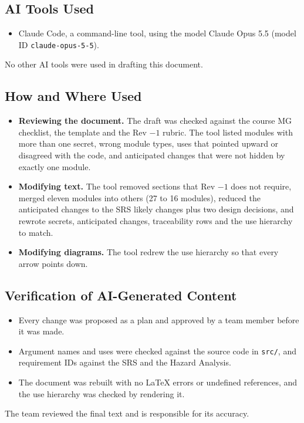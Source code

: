 \documentclass[12pt, titlepage]{article}
\begin{document}
\subsection*{AI Tools Used}

\begin{itemize}
\item Claude Code, a command-line tool, using the model Claude Opus 5.5
  (model ID \texttt{claude-opus-5-5}).
\end{itemize}
No other AI tools were used in drafting this document.

\subsection*{How and Where Used}

\begin{itemize}
\item \textbf{Reviewing the document.} The draft was checked against the course
  MG checklist, the template and the Rev $-1$ rubric. The tool listed modules
  with more than one secret, wrong module types, uses that pointed upward or
  disagreed with the code, and anticipated changes that were not hidden by
  exactly one module.
\item \textbf{Modifying text.} The tool removed sections that Rev $-1$ does not
  require, merged eleven modules into others (27 to 16 modules), reduced the
  anticipated changes to the SRS likely changes plus two design decisions, and rewrote
  secrets, anticipated changes, traceability rows and the use hierarchy
  to match.
\item \textbf{Modifying diagrams.} The tool redrew the use hierarchy so that
  every arrow points down.
\end{itemize}

\subsection*{Verification of AI-Generated Content}

\begin{itemize}
\item Every change was proposed as a plan and approved by a team member before
  it was made.
\item Argument names and uses were checked against the source code in
  \texttt{src/}, and requirement IDs against the SRS and the Hazard Analysis.
\item The document was rebuilt with no LaTeX errors or undefined references, and
  the use hierarchy was checked by rendering it.
\end{itemize}
The team reviewed the final text and is responsible for its accuracy.




\end{document}
